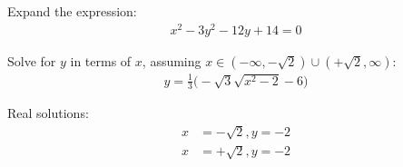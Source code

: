 Expand the expression:
\begin{align*}
x^{2} - 3 y^{2} - 12y + 14 = 0
\end{align*}

Solve for $y$ in terms of $x$, assuming $x\in(-\infty, -\sqrt{2}) \cup (+\sqrt{2}, \infty)$:
\begin{align*}
y = \frac{1}{3} \bigl(- \sqrt{3} \sqrt{x^{2}-2} - 6 \bigr)
\end{align*}

Real solutions:
\begin{align*}
x & = -\sqrt{2}, y=-2
\\
x & = +\sqrt{2}, y=-2
\end{align*}
